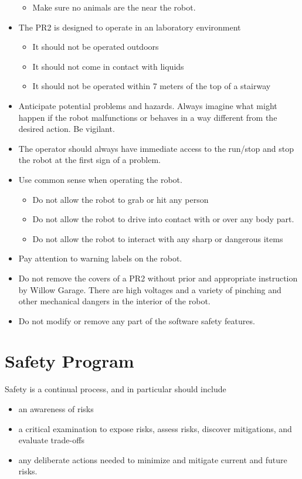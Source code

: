 \begin{itemize}
\begin{itemize}
\item Make sure no animals are the near the robot.
\end{itemize}
\item The PR2 is designed to operate in an laboratory environment
\begin{itemize}
\item It should not be operated outdoors
\item It should not come in contact with liquids
\item It should not be operated within 7 meters of the top of a stairway
\end{itemize}
\item Anticipate potential problems and hazards.  Always imagine what might happen if the robot malfunctions or behaves in a way different from the desired action.  Be vigilant.
\item The operator should always have immediate access to the run/stop and stop the robot at the first sign of a problem.
\item Use common sense when operating the robot.
\begin{itemize}
\item Do not allow the robot to grab or hit any person
\item Do not allow the robot to drive into contact with or over any body part.
\item Do not allow the robot to interact with any sharp or dangerous items
\end{itemize}
\item Pay attention to warning labels on the robot.
\item Do not remove the covers of a PR2 without prior and appropriate instruction by Willow Garage. There are high voltages and a variety of pinching and other mechanical dangers in the interior of the robot.
\item Do not modify or remove any part of the software safety features.
\end{itemize}

\section{Safety Program}

Safety is a continual process, and in particular should include

\begin{itemize}
\item an awareness of risks
\item a critical examination to expose risks, assess risks, discover mitigations, and evaluate trade-offs
\item any deliberate actions needed to minimize and mitigate current and future risks.
\end{itemize}

